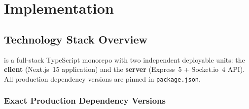 \section{Implementation}
\label{sec:implementation}

\subsection{Technology Stack Overview}

\echoray{} is a full-stack TypeScript monorepo with two independent
deployable units: the \textbf{client} (Next.js~15 application) and the
\textbf{server} (Express~5 + Socket.io~4 API). All production dependency
versions are pinned in \texttt{package.json}.

\subsubsection{Exact Production Dependency Versions}

